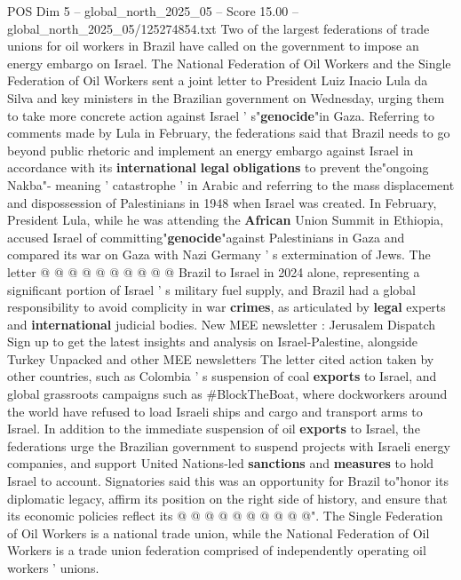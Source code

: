\begin{textsample}{POS Dim 5 – global\_north\_2025\_05 – Score 15.00 – global\_north\_2025\_05/125274854.txt}  \label{ex:f5_pos_132}
Two of the largest federations of trade unions for oil workers in Brazil have called on the government to impose an energy embargo on Israel.
The National Federation of Oil Workers and the Single Federation of Oil Workers sent a joint letter to President Luiz Inacio Lula da Silva and key ministers in the Brazilian government on Wednesday, urging them to take more concrete action against Israel ' s"\textbf{genocide}"in Gaza.
Referring to comments made by Lula in February, the federations said that Brazil needs to go beyond public rhetoric and implement an energy embargo against Israel in accordance with its \textbf{international} \textbf{legal} \textbf{obligations} to prevent the"ongoing Nakba"- meaning ' catastrophe ' in Arabic and referring to the mass displacement and dispossession of Palestinians in 1948 when Israel was created.
In February, President Lula, while he was attending the \textbf{African} Union Summit in Ethiopia, accused Israel of committing"\textbf{genocide}"against Palestinians in Gaza and compared its war on Gaza with Nazi Germany ' s extermination of Jews.
The letter @ @ @ @ @ @ @ @ @ @ Brazil to Israel in 2024 alone, representing a significant portion of Israel ' s military fuel supply, and Brazil had a global responsibility to avoid complicity in war \textbf{crimes}, as articulated by \textbf{legal} experts and \textbf{international} judicial bodies.
New MEE newsletter : Jerusalem Dispatch Sign up to get the latest insights and analysis on Israel-Palestine, alongside Turkey Unpacked and other MEE newsletters The letter cited action taken by other countries, such as Colombia ' s suspension of coal \textbf{exports} to Israel, and global grassroots campaigns such as \#BlockTheBoat, where dockworkers around the world have refused to load Israeli ships and cargo and transport arms to Israel.
In addition to the immediate suspension of oil \textbf{exports} to Israel, the federations urge the Brazilian government to suspend projects with Israeli energy companies, and support United Nations-led \textbf{sanctions} and \textbf{measures} to hold Israel to account.
Signatories said this was an opportunity for Brazil to"honor its diplomatic legacy, affirm its position on the right side of history, and ensure that its economic policies reflect its @ @ @ @ @ @ @ @ @ @".
The Single Federation of Oil Workers is a national trade union, while the National Federation of Oil Workers is a trade union federation comprised of independently operating oil workers ' unions.

\end{textsample}
